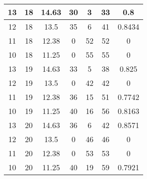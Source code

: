\documentclass[letterpaper, 12pt]{article}
\begin{document}
\begin{longtable}{|c|c|c|c|c|c|c|}
\hline
13 & 18 & 14.63 & 30 & 3 & 33 & 0.8 \\
\hline
12 & 18 & 13.5 & 35 & 6 & 41 & 0.8434 \\
\hline
11 & 18 & 12.38 & 0 & 52 & 52 & 0 \\
\hline
10 & 18 & 11.25 & 0 & 55 & 55 & 0 \\
\hline
13 & 19 & 14.63 & 33 & 5 & 38 & 0.825 \\
\hline
12 & 19 & 13.5 & 0 & 42 & 42 & 0 \\
\hline
11 & 19 & 12.38 & 36 & 15 & 51 & 0.7742 \\
\hline
10 & 19 & 11.25 & 40 & 16 & 56 & 0.8163 \\
\hline
13 & 20 & 14.63 & 36 & 6 & 42 & 0.8571 \\
\hline
12 & 20 & 13.5 & 0 & 46 & 46 & 0 \\
\hline
11 & 20 & 12.38 & 0 & 53 & 53 & 0 \\
\hline
10 & 20 & 11.25 & 40 & 19 & 59 & 0.7921 \\
\hline
\end{longtable}
\end{document}
